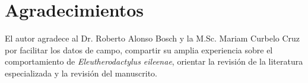 \chapter*{Agradecimientos}\label{chapter:agradecimientos}


El autor agradece al Dr. Roberto Alonso 
Bosch y la M.Sc. Mariam Curbelo Cruz por facilitar los datos de 
campo, 
compartir su amplia experiencia sobre el 
comportamiento de \emph{Eleutherodactylus 
eileenae}, orientar la revisión de la 
literatura especializada y la revisión del manuscrito.
